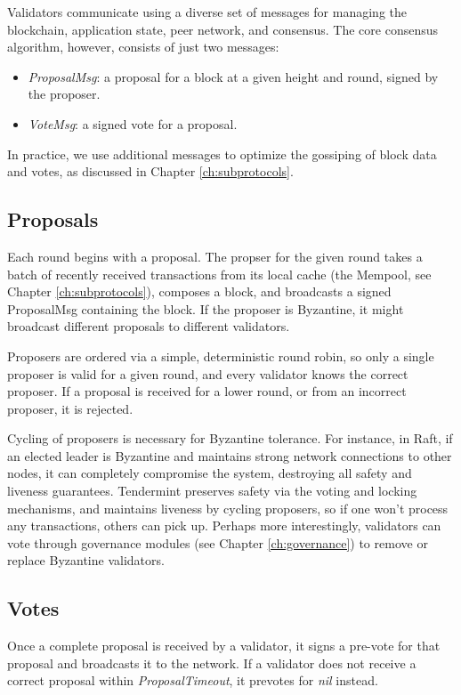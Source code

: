 Validators communicate using a diverse set of messages for managing the blockchain, 
application state, peer network, and consensus.
The core consensus algorithm, however, consists of just two messages:

\begin{itemize}
\item{\emph{ProposalMsg}: a proposal for a block at a given height and round, signed by the proposer.}
\item{\emph{VoteMsg}: a signed vote for a proposal.}
\end{itemize}

In practice, we use additional messages to optimize the gossiping of block data and votes, as discussed in Chapter \ref{ch:subprotocols}.

\subsection{Proposals}

Each round begins with a proposal. 
The propser for the given round takes a batch of recently received transactions from its local cache (the Mempool, see Chapter \ref{ch:subprotocols}),
composes a block, and broadcasts a signed ProposalMsg containing the block.
If the proposer is Byzantine, it might broadcast different proposals to different validators.

Proposers are ordered via a simple, deterministic round robin, 
so only a single proposer is valid for a given round, 
and every validator knows the correct proposer. 
If a proposal is received for a lower round, or from an incorrect proposer, it is rejected.

Cycling of proposers is necessary for Byzantine tolerance. 
For instance, in Raft, if an elected leader is Byzantine and maintains strong network connections to other nodes,
it can completely compromise the system, destroying all safety and liveness guarantees.
Tendermint preserves safety via the voting and locking mechanisms, 
and maintains liveness by cycling proposers, so if one won't process any transactions, others can pick up.
Perhaps more interestingly, validators can vote through governance modules (see Chapter \ref{ch:governance}) to remove or replace Byzantine validators.

\subsection{Votes}

Once a complete proposal is received by a validator, 
it signs a pre-vote for that proposal and broadcasts it to the network.
If a validator does not receive a correct proposal within \emph{ProposalTimeout}, 
it prevotes for \emph{nil} instead.

